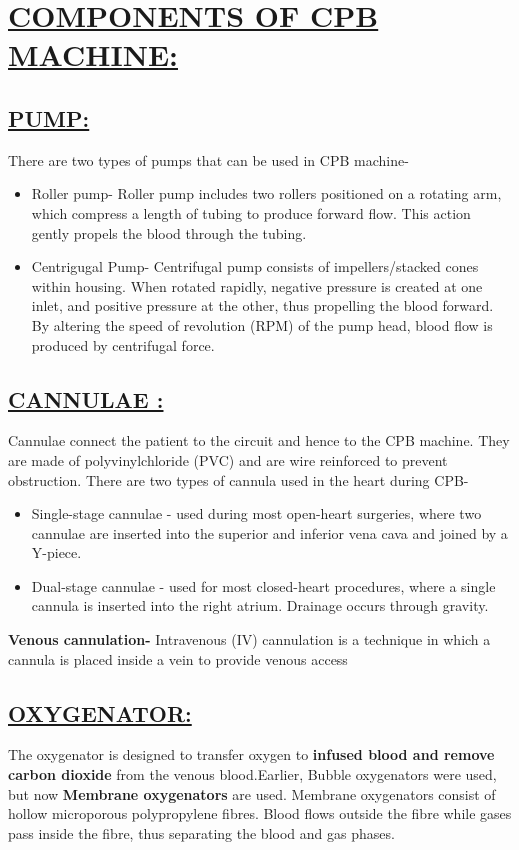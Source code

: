 \documentclass[12pt]{article}
\begin{document}
\section{\underline{COMPONENTS OF CPB MACHINE:}}
\subsection{\underline{PUMP:}}
There are two types of pumps that can be used in CPB machine-
\begin{itemize}
\item Roller pump- 
Roller pump includes two rollers positioned on a rotating arm, which compress a length of tubing to produce forward flow. This action gently propels the blood through the tubing.

\item Centrigugal Pump-
 Centrifugal pump consists of impellers/stacked cones within housing. When rotated rapidly, negative pressure is created at one inlet, and positive pressure at the other, thus propelling the blood forward. By altering the speed of revolution (RPM) of the pump head, blood flow is produced by centrifugal force. 
\end{itemize}
\subsection{\underline{CANNULAE :}}
Cannulae connect the patient to the circuit and hence to the CPB machine. They are made of polyvinylchloride (PVC) and are wire reinforced to prevent obstruction.
There are two types of cannula used in the heart during CPB-
\begin{itemize}
\item Single-stage cannulae - used during most open-heart surgeries, where two cannulae are inserted into the superior and inferior vena cava and joined by a Y-piece.
\item Dual-stage cannulae - used for most closed-heart procedures, where a single cannula is inserted into the right atrium. Drainage occurs through gravity.
\end{itemize}
\textbf {Venous cannulation-} Intravenous (IV) cannulation is a technique in which a cannula is placed inside a vein to provide venous access

\subsection{\underline{OXYGENATOR:}}
The oxygenator is designed to transfer oxygen to \textbf{infused blood and remove carbon dioxide} from the venous blood.Earlier, Bubble oxygenators were used, but now \textbf{Membrane oxygenators} are used. Membrane oxygenators consist of hollow microporous polypropylene fibres.  Blood flows outside the fibre while gases pass inside the fibre, thus separating the blood and gas phases.
\end{document}
